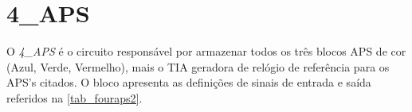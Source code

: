 \renewcommand{\NomeBloco}{4\_APS}
\renewcommand{\NomeBlocoNoUnderline}{fouraps}
\renewcommand{\NomePTab}{tab_\NomeBlocoNoUnderline}
\renewcommand{\NomeSTab}{tab_\NomeBlocoNoUnderline2}
\renewcommand{\NomePFig}{fig_\NomeBlocoNoUnderline}
\renewcommand{\NomeSFig}{fig_\NomeBlocoNoUnderline2}
\renewcommand{\NomeTTab}{tab_\NomeBlocoNoUnderline3}
\renewcommand{\NomeQTab}{tab_\NomeBlocoNoUnderline4}

\section{\NomeBloco}

O \emph{\NomeBloco} \'e o circuito respons\'avel por armazenar todos os tr\^es blocos APS de cor (Azul, Verde, Vermelho), mais o TIA geradora de rel\'ogio de refer\^encia para os APS's citados. O bloco apresenta as defini{\c c}\~oes de sinais de entrada e sa\'ida referidos na \autoref{\NomeSTab}.

